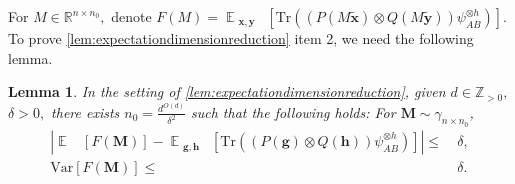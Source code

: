 \documentclass[10pt,a4paper]{article}
\theoremstyle{plain}
\newtheorem{lemma}[theorem]{Lemma}
\theoremstyle{definition}
\newcommand {\minusspace} {\: \! \!}
\newcommand {\Fn} [2] {\ensuremath{ #1 \minusspace \Br{ #2 } }}
\newcommand{\reals}{{\mathbb R}}
\newcommand {\br} [1] {\ensuremath{ \left( #1 \right) }}
\newcommand {\Br} [1] {\ensuremath{ \left[ #1 \right] }}
\newcommand {\ab} [1] {\ensuremath{ \left| #1 \right| }}
\DeclareMathOperator*{\bigE}{\mathbb{E}}
\newcommand {\expec} [2] {\Fn{\bigE_{\substack{#1}}}{#2}}
\newcommand {\Tr} {\ensuremath{ \mathrm{Tr} }}
\newcommand{\posint}{{\mathbb Z}_{>0}}
\newcommand{\randg}{\ensuremath{\mathbf{g}}}
\newcommand{\randh}{\ensuremath{\mathbf{h}}}
\newcommand{\randx}{\ensuremath{\mathbf{x}}}
\newcommand{\randy}{\ensuremath{\mathbf{y}}}
\newcommand {\var} [1] {\mathrm{Var}\Br{#1}}
\newcommand{\1}{\mathbb{1}} %
\begin{document}
For $M\in\reals^{n\times n_0},$ denote $F(M)=\expec{\mathbf{x},\mathbf{y}}{\Tr\br{\br{P(M\tilde{\randx})\otimes Q(M\tilde{\randy})}\psi_{AB}^{\otimes h}}}$. 
To prove \cref{lem:expectationdimensionreduction} item 2, we need the following lemma.

\begin{lemma}\label{lem:meanvar}
In the setting of \cref{lem:expectationdimensionreduction}, given $d\in\posint,$ $\delta>0,$ there exists $n_0=\frac{d^{O(d)}}{\delta^2}$ such that the following holds: For $\mathbf{M}\sim\gamma_{n\times n_0}$,
\begin{align*}
\ab{\expec{}{F(\mathbf{M})}-\expec{\mathbf{g},\mathbf{h}}{\Tr\br{\br{P(\randg)\otimes Q(\randh)}\psi_{AB}^{\otimes h}}}}\leq~&\delta,\\
\var{F(\mathbf{M})}\leq~&\delta.\\
\end{align*}
\end{lemma}
\end{document}
